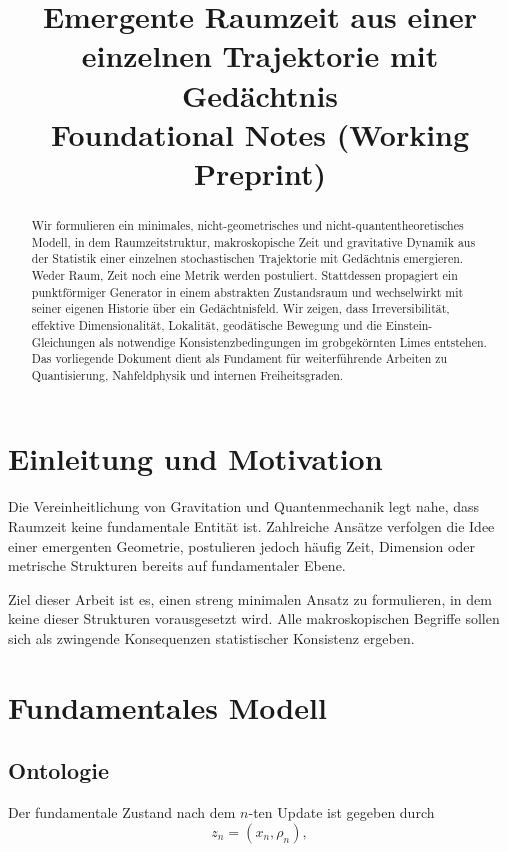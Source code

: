 \documentclass[11pt,a4paper]{article}
\title{Emergente Raumzeit aus einer einzelnen Trajektorie mit Gedächtnis \\ \large{Foundational Notes (Working Preprint)}}
\author{ }
\date{ }
\begin{document}
\maketitle

\begin{abstract}
Wir formulieren ein minimales, nicht-geometrisches und nicht-quantentheoretisches Modell, in dem Raumzeitstruktur, makroskopische Zeit und gravitative Dynamik aus der Statistik einer einzelnen stochastischen Trajektorie mit Gedächtnis emergieren. Weder Raum, Zeit noch eine Metrik werden postuliert. Stattdessen propagiert ein punktförmiger Generator in einem abstrakten Zustandsraum und wechselwirkt mit seiner eigenen Historie über ein Gedächtnisfeld. Wir zeigen, dass Irreversibilit\"at, effektive Dimensionalit\"at, Lokalität, geodätische Bewegung und die Einstein-Gleichungen als notwendige Konsistenzbedingungen im grobgek\"ornten Limes entstehen. Das vorliegende Dokument dient als Fundament für weiterführende Arbeiten zu Quantisierung, Nahfeldphysik und internen Freiheitsgraden.
\end{abstract}

\section{Einleitung und Motivation}

Die Vereinheitlichung von Gravitation und Quantenmechanik legt nahe, dass Raumzeit keine fundamentale Entität ist. Zahlreiche Ansätze verfolgen die Idee einer emergenten Geometrie, postulieren jedoch häufig Zeit, Dimension oder metrische Strukturen bereits auf fundamentaler Ebene.

Ziel dieser Arbeit ist es, einen streng minimalen Ansatz zu formulieren, in dem keine dieser Strukturen vorausgesetzt wird. Alle makroskopischen Begriffe sollen sich als zwingende Konsequenzen statistischer Konsistenz ergeben.

\section{Fundamentales Modell}

\subsection{Ontologie}

Der fundamentale Zustand nach dem $n$-ten Update ist gegeben durch
\begin{equation}
z_n = (x_n, \rho_n),
\end{equation}
\end{document}
